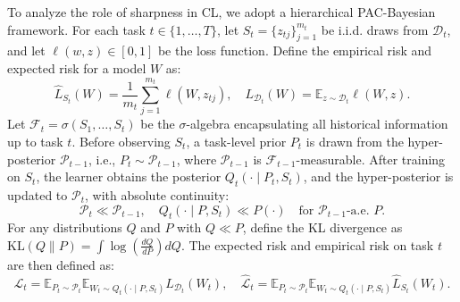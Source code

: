 \documentclass{article} %
\begin{document}




To analyze the role of sharpness in CL, we adopt a hierarchical PAC-Bayesian framework.
For each task \(t \in \{1, \dots, T\}\), let \(S_t = \{z_{tj}\}_{j=1}^{m_t}\) be i.i.d. draws from \(\mathcal{D}_t\), and let \(\ell(w, z) \in [0,1]\) be the loss function. Define the empirical risk and expected risk for a model \(W\) as:
\[
\hat{L}_{S_t}(W) = \frac{1}{m_t} \sum_{j=1}^{m_t} \ell(W, z_{tj}), \quad
L_{\mathcal{D}_t}(W) = \mathbb{E}_{z \sim \mathcal{D}_t} \ell(W, z).
\]
Let \(\mathcal{F}_t = \sigma(S_1, \dots, S_t)\) be the \(\sigma\)-algebra encapsulating all historical information up to task \(t\). Before observing \(S_t\), a task-level prior \(P_t\) is drawn from the hyper-posterior \(\mathcal{P}_{t-1}\), i.e., \(P_t \sim \mathcal{P}_{t-1}\), where \(\mathcal{P}_{t-1}\) is \(\mathcal{F}_{t-1}\)-measurable. After training on \(S_t\), the learner obtains the posterior \(Q_t(\cdot \mid P_t, S_t)\), and the hyper-posterior is updated to \(\mathcal{P}_t\), with absolute continuity:
\[
\mathcal{P}_t \ll \mathcal{P}_{t-1}, \quad
Q_t(\cdot \mid P, S_t) \ll P(\cdot) \quad \text{for } \mathcal{P}_{t-1}\text{-a.e. } P.
\]
For any distributions \(Q\) and \(P\) with \(Q \ll P\), define the KL divergence as \(\mathrm{KL}(Q \| P) = \int \log\left( \frac{dQ}{dP} \right) dQ\). The expected risk and empirical risk on task \(t\) are then defined as:
\[
\mathcal{L}_t = \mathbb{E}_{P_t \sim \mathcal{P}_{t}} \mathbb{E}_{W_t \sim Q_t(\cdot \mid P, S_t)} L_{\mathcal{D}_t}(W_t), \quad
\hat{\mathcal{L}}_t = \mathbb{E}_{P_t \sim \mathcal{P}_{t}} \mathbb{E}_{W_t \sim Q_t(\cdot \mid P, S_t)} \hat{L}_{S_t}(W_t).
\]
\end{document}
